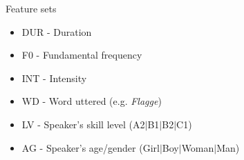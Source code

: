 \documentclass[xcolor={dvipsnames}]{beamer}
\begin{document}
		\begin{frame}{Feature sets}
			\begin{itemize}
			\item DUR - Duration
			\item F0 - Fundamental frequency
			\item INT - Intensity 
			\end{itemize}
			
		\vspace{1em}	
			
			\begin{itemize}
			\item WD - Word uttered (e.g. \textit{Flagge})
			\item LV - Speaker's skill level (A2$|$B1$|$B2$|$C1)
			\item AG - Speaker's age/gender (Girl$|$Boy$|$Woman$|$Man)
			\end{itemize}

		\end{frame}


\end{document}

